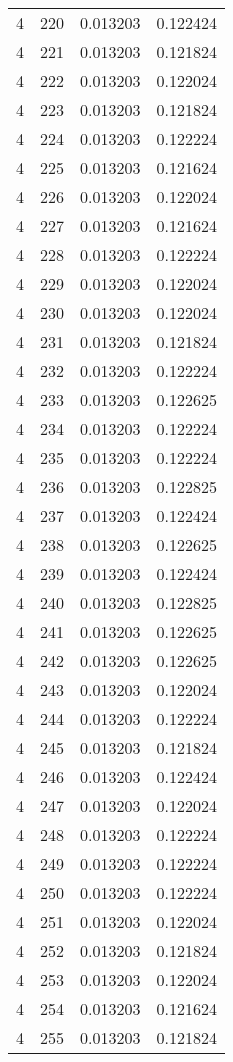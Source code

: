 \begin{longtable}{rrrr}
4 & 220 & 0.013203 & 0.122424 \\
4 & 221 & 0.013203 & 0.121824 \\
4 & 222 & 0.013203 & 0.122024 \\
4 & 223 & 0.013203 & 0.121824 \\
4 & 224 & 0.013203 & 0.122224 \\
4 & 225 & 0.013203 & 0.121624 \\
4 & 226 & 0.013203 & 0.122024 \\
4 & 227 & 0.013203 & 0.121624 \\
4 & 228 & 0.013203 & 0.122224 \\
4 & 229 & 0.013203 & 0.122024 \\
4 & 230 & 0.013203 & 0.122024 \\
4 & 231 & 0.013203 & 0.121824 \\
4 & 232 & 0.013203 & 0.122224 \\
4 & 233 & 0.013203 & 0.122625 \\
4 & 234 & 0.013203 & 0.122224 \\
4 & 235 & 0.013203 & 0.122224 \\
4 & 236 & 0.013203 & 0.122825 \\
4 & 237 & 0.013203 & 0.122424 \\
4 & 238 & 0.013203 & 0.122625 \\
4 & 239 & 0.013203 & 0.122424 \\
4 & 240 & 0.013203 & 0.122825 \\
4 & 241 & 0.013203 & 0.122625 \\
4 & 242 & 0.013203 & 0.122625 \\
4 & 243 & 0.013203 & 0.122024 \\
4 & 244 & 0.013203 & 0.122224 \\
4 & 245 & 0.013203 & 0.121824 \\
4 & 246 & 0.013203 & 0.122424 \\
4 & 247 & 0.013203 & 0.122024 \\
4 & 248 & 0.013203 & 0.122224 \\
4 & 249 & 0.013203 & 0.122224 \\
4 & 250 & 0.013203 & 0.122224 \\
4 & 251 & 0.013203 & 0.122024 \\
4 & 252 & 0.013203 & 0.121824 \\
4 & 253 & 0.013203 & 0.122024 \\
4 & 254 & 0.013203 & 0.121624 \\
4 & 255 & 0.013203 & 0.121824 \\

\end{longtable}
